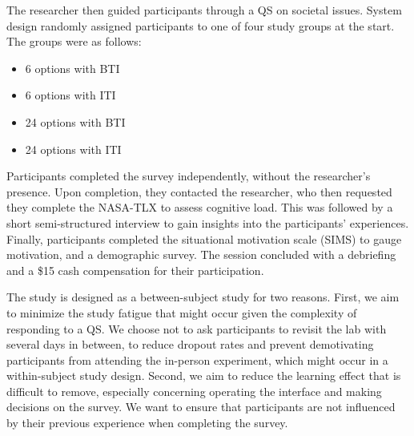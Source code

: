 The researcher then guided participants through a QS on societal issues. System design randomly assigned participants to one of four study groups at the start. The groups were as follows:
\begin{itemize}
    \item 6 options with BTI
    \item 6 options with ITI
    \item 24 options with BTI
    \item 24 options with ITI
\end{itemize}
Participants completed the survey independently, without the researcher's presence. Upon completion, they contacted the researcher, who then requested they complete the NASA-TLX to assess cognitive load. This was followed by a short semi-structured interview to gain insights into the participants' experiences. Finally, participants completed the situational motivation scale (SIMS) to gauge motivation, and a demographic survey. The session concluded with a debriefing and a \$15 cash compensation for their participation.

The study is designed as a between-subject study for two reasons. First, we aim to minimize the study fatigue that might occur given the complexity of responding to a QS. We choose not to ask participants to revisit the lab with several days in between, to reduce dropout rates and prevent demotivating participants from attending the in-person experiment, which might occur in a within-subject study design. Second, we aim to reduce the learning effect that is difficult to remove, especially concerning operating the interface and making decisions on the survey. We want to ensure that participants are not influenced by their previous experience when completing the survey.

